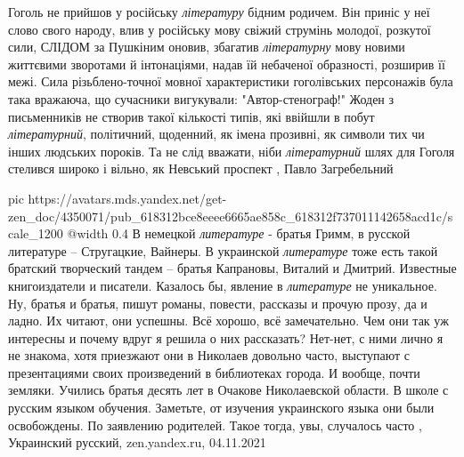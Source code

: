 Гоголь не прийшов у російську \emph{літературу} бідним родичем. Він приніс у
неї слово свого народу, влив у російську мову свіжий струмінь молодої, розкутої
сили, СЛІДОМ за Пушкіним оновив, збагатив \emph{літературну} мову новими
життєвими зворотами й інтонаціями, надав їй небаченої образності, розширив її
межі. Сила різьблено-точної мовної характеристики гоголівських персонажів була
така вражаюча, що сучасники вигукували: "Автор-стенограф!" Жоден з письменників
не створив такої кількості типів, які ввійшли в побут \emph{літературний},
політичний, щоденний, як імена прозивні, як символи тих чи інших людських
пороків.  Та не слід вважати, ніби \emph{літературний} шлях для Гоголя стелився
широко і вільно, як Невський проспект
, Павло Загребельний

\ifcmt
  pic https://avatars.mds.yandex.net/get-zen_doc/4350071/pub_618312bce8eeee6665ae858c_618312f737011142658acd1c/scale_1200
  @width 0.4
\fi
В немецкой \emph{литературе} - братья Гримм, в русской литературе – Стругацкие,
Вайнеры. В украинской \emph{литературе} тоже есть такой братский творческий
тандем – братья Капрановы, Виталий и Дмитрий. Известные книгоиздатели и
писатели.  Казалось бы, явление в \emph{литературе} не уникальное. Ну, братья и
братья, пишут романы, повести, рассказы и прочую прозу, да и ладно. Их читают,
они успешны. Всё хорошо, всё замечательно.  Чем они так уж интересны и почему
вдруг я решила о них рассказать? Нет-нет, с ними лично я не знакома, хотя
приезжают они в Николаев довольно часто, выступают с презентациями своих
произведений в библиотеках города. И вообще, почти земляки. Учились братья
десять лет в Очакове Николаевской области. В школе с русским языком обучения.
Заметьте, от изучения украинского языка они были освобождены. По заявлению
родителей. Такое тогда, увы, случалось часто
, Украинский русский, zen.yandex.ru, 04.11.2021
